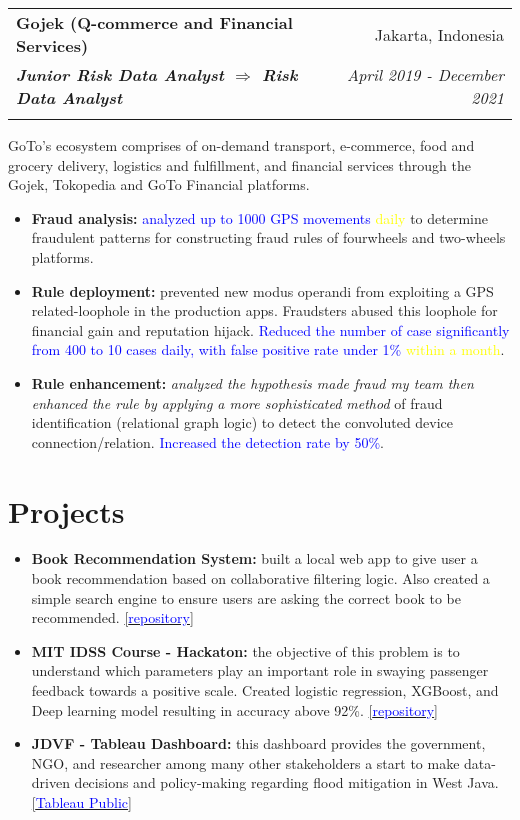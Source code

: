 \documentclass[a4paper, 11pt]{article}
\makeatletter
\newcommand{\resumeItem}[2]{
    \item\small{
        \textbf{#1}{#2 \vspace{-2pt}}
    }
}
\newcommand{\resumeSubheading}[4]{
    \vspace{-1pt}
    \begin{tabular*}{0.97\textwidth}{l@{\extracolsep{\fill}}r}
        \color{lightblue}\textbf{#1} & #2 \\
        \textbf{\textit{\small#3}} & \textit{\small #4} \\
        \textnormal{}\vspace{-5pt}
    \end{tabular*}\vspace{-5pt}
}
\newcommand{\resumeSubHeadingListEnd}{\end{itemize}}
\newcommand{\resumeItemListStart}{\begin{itemize}[leftmargin=*]\setlength\itemsep{0em}\vspace{-1pt}}
\newcommand{\resumeItemListEnd}{\end{itemize}\vspace{-5pt}}
\makeatother
\begin{document}
    \vspace{5pt}
    \resumeSubheading
    {Gojek (Q-commerce and Financial Services)}
    {Jakarta, Indonesia}
    {Junior Risk Data Analyst $\Rightarrow$ Risk Data Analyst}
    {April 2019 - December 2021}
    {GoTo’s ecosystem comprises of on-demand transport, e-commerce, food and grocery 
    delivery, logistics and fulfillment, and financial services through the Gojek, 
    Tokopedia and GoTo Financial platforms.}
    \vspace{-5pt}
    \resumeItemListStart
    \resumeItem{Fraud analysis:}{ \textcolor{blue}{analyzed up to 1000 GPS movements} 
    \textcolor{yellow}{daily} to determine fraudulent patterns for constructing fraud 
    rules of fourwheels and two-wheels platforms.}
    \resumeItem{Rule deployment:}{ prevented new modus operandi from exploiting a GPS 
    related-loophole in the production apps. Fraudsters abused this loophole for 
    financial gain and reputation hijack. \textcolor{blue}{Reduced the number of
    case significantly from 400 to 10 cases daily, with false positive rate under 1\%} 
    \textcolor{yellow}{within a month}.}
    \resumeItem{Rule enhancement:}{ \textit{analyzed the hypothesis made fraud my 
    team then enhanced the rule by applying a more sophisticated method} of fraud 
    identification (relational graph logic) to detect the convoluted device 
    connection/relation. \textcolor{blue}{Increased the detection rate by 50\%}.}
    \resumeItemListEnd


    \vspace{-5pt}
    \section{Projects}

    \resumeItemListStart
    \resumeItem{Book Recommendation System:}{ built a local web app to give user a book recommendation based on collaborative filtering logic.
    Also created a simple search engine to ensure users are asking the correct book to be recommended. 
    \href{https://github.com/amrirasyidi/book_recommendation}{[\textcolor{blue}{repository}]}}
    \resumeItem{MIT IDSS Course - Hackaton:}{ the objective of this problem is to understand which parameters play an important role in swaying
    passenger feedback towards a positive scale. Created logistic regression, XGBoost, and Deep learning model resulting in accuracy
    above 92\%. 
    \href{https://github.com/amrirasyidi/mit_idss_hackaton}{[\textcolor{blue}{repository}]}}
    \resumeItem{JDVF - Tableau Dashboard:}{ this dashboard provides the government, NGO, and researcher among many other stakeholders a start
    to make data-driven decisions and policy-making regarding flood mitigation in West Java. 
    \href{https://public.tableau.com/app/profile/faisal.putra/viz/Book1_16671939458310/DashboardFINAL}{[\textcolor{blue}{Tableau Public}]}}
    \resumeItemListEnd
    
\end{document}
